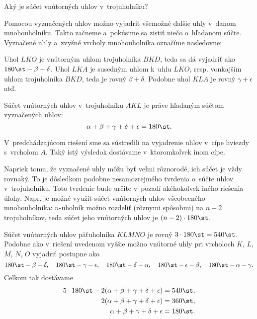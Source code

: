 {%
\napad
Aký je súčet vnútorných uhlov v~trojuholníku?

\riesenie
Pomocou vyznačených uhlov možno vyjadriť všemožné ďalšie uhly v~danom mnohouholníku.
Takto začneme a~pokúsime sa zistiť niečo o~hľadanom súčte.
Vyznačené uhly a~zvyšné vrcholy mnohouholníka označíme nasledovne:
%


Uhol $LKO$ je vnútorným uhlom trojuholníka $BKD$, teda sa dá vyjadriť ako $180\st-\beta-\delta$.
Uhol $LKA$ je susedným uhlom k~uhlu $LKO$, resp. vonkajším uhlom trojuholníka $BKD$, teda je rovný $\beta+\delta$.
Podobne uhol $KLA$ je rovný $\gamma+\epsilon$ atď.

Súčet vnútorných uhlov v~trojuholníku $AKL$ je práve hľadaným súčtom vyznačených uhlov:
$$
\alpha+\beta+\gamma+\delta+\epsilon=180\st.
$$

\poznamky
V~predchádzajúcom riešení sme sa sústredili na vyjadrenie uhlov v~cípe hviezdy s~vrcholom $A$.
Taký istý výsledok dostávame v~ktoromkoľvek inom cípe.

Napriek tomu, že vyznačené uhly môžu byť veľmi rôznorodé, ich súčet je vždy rovnaký.
To je dôsledkom podobne nesamozrejmého tvrdenia o~súčte uhlov v~trojuholníku.
Toto tvrdenie bude určite v~pozadí akéhokoľvek iného riešenia úlohy.
Napr. je možné využiť súčet vnútorných uhlov všeobecného mnohouholníka:
$n$-uholník možno rozdeliť (rôznymi spôsobmi) na $n-2$ trojuholníkov, teda súčet jeho vnútorných uhlov je ${(n-2)}\cdot180\st$.

\ineriesenie
Súčet vnútorných uhlov päťuholníka $KLMNO$ je rovný $3\cdot180\st=540\st$.
Podobne ako v~riešení uvedenom vyššie možno vnútorné uhly pri vrcholoch $K$, $L$, $M$, $N$, $O$ vyjadriť postupne ako
$$
180\st-\beta-\delta,\quad
180\st-\gamma-\epsilon,\quad
180\st-\delta-\alpha,\quad
180\st-\epsilon-\beta,\quad
180\st-\alpha-\gamma.
$$
Celkom tak dostávame
$$\aligned
5\cdot180\st -2(\alpha+\beta+\gamma+\delta+\epsilon) &=540\st, \\
2(\alpha+\beta+\gamma+\delta+\epsilon) &=360\st, \\
\alpha+\beta+\gamma+\delta+\epsilon &=180\st.
\endaligned
$$
}

